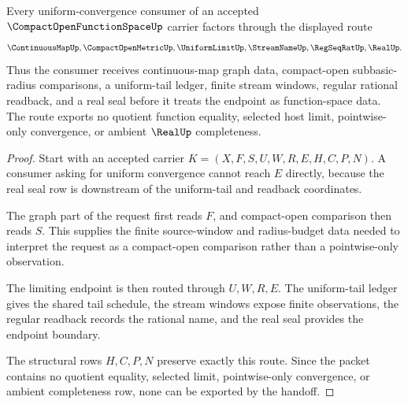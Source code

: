 \begin{theorem}
\label{thm:compact-open-function-space-uniform-convergence-handoff}
Every uniform-convergence consumer of an accepted $\CompactOpenFunctionSpaceUp$ carrier factors through the displayed route
$$
\ContinuousMapUp,\CompactOpenMetricUp,\UniformLimitUp,\StreamNameUp,\RegSeqRatUp,\RealUp .
$$
Thus the consumer receives continuous-map graph data, compact-open subbasic-radius comparisons, a uniform-tail ledger, finite stream windows, regular rational readback, and a real seal before it treats the endpoint as function-space data. The route exports no quotient function equality, selected host limit, pointwise-only convergence, or ambient $\RealUp$ completeness.
\end{theorem}
\begin{proof}
Start with an accepted carrier $K=(X,F,S,U,W,R,E,H,C,P,N)$. A consumer asking for uniform convergence cannot reach $E$ directly, because the real seal row is downstream of the uniform-tail and readback coordinates.

The graph part of the request first reads $F$, and compact-open comparison then reads $S$. This supplies the finite source-window and radius-budget data needed to interpret the request as a compact-open comparison rather than a pointwise-only observation.

The limiting endpoint is then routed through $U,W,R,E$. The uniform-tail ledger gives the shared tail schedule, the stream windows expose finite observations, the regular readback records the rational name, and the real seal provides the endpoint boundary.

The structural rows $H,C,P,N$ preserve exactly this route. Since the packet contains no quotient equality, selected limit, pointwise-only convergence, or ambient completeness row, none can be exported by the handoff.
\end{proof}

